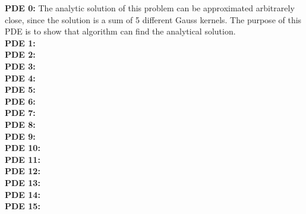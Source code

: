 \documentclass[./\jobname.tex]{subfiles}
\begin{document}
\begin{table}[h]
{\begin{tabular}{|c|c|c|}
		\end{tabular}
	}
	\label{tab:testbed}
\end{table}

\textbf{PDE 0: } The analytic solution of this problem can be approximated arbitrarely close, since the solution is a sum of 5 different Gauss kernels. The purpose of this PDE is to show that algorithm can find the analytical solution. \\

\textbf{PDE 1: } \\

\textbf{PDE 2: } \\

\textbf{PDE 3: } \\

\textbf{PDE 4: } \\

\textbf{PDE 5: } \\

\textbf{PDE 6: } \\

\textbf{PDE 7: } \\

\textbf{PDE 8: } \\

\textbf{PDE 9: } \\

\textbf{PDE 10: } \\

\textbf{PDE 11: } \\

\textbf{PDE 12: } \\

\textbf{PDE 13: } \\

\textbf{PDE 14: } \\

\textbf{PDE 15: } \\
\end{document}
